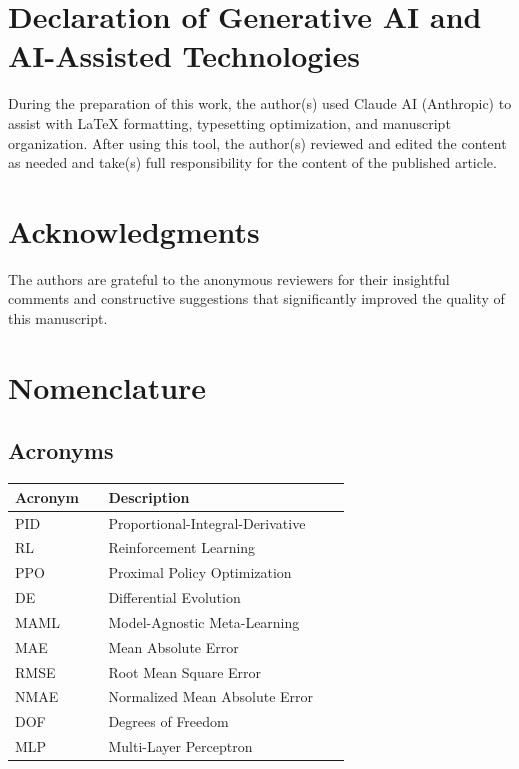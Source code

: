 \documentclass[a4paper]{cas-sc}
\begin{document}
\section*{Declaration of Generative AI and AI-Assisted Technologies}

During the preparation of this work, the author(s) used Claude AI (Anthropic) to assist with LaTeX formatting, typesetting optimization, and manuscript organization. After using this tool, the author(s) reviewed and edited the content as needed and take(s) full responsibility for the content of the published article.

\section*{Acknowledgments}

The authors are grateful to the anonymous reviewers for their insightful comments and constructive suggestions that significantly improved the quality of this manuscript.


\printcredits


\section*{Nomenclature}

\subsection*{Acronyms}
\begin{tabular}{@{}p{0.25\linewidth}p{0.65\linewidth}@{}}
\toprule
\textbf{Acronym} & \textbf{Description} \\
\midrule
PID & Proportional-Integral-Derivative \\
RL & Reinforcement Learning \\
PPO & Proximal Policy Optimization \\
DE & Differential Evolution \\
MAML & Model-Agnostic Meta-Learning \\
MAE & Mean Absolute Error \\
RMSE & Root Mean Square Error \\
NMAE & Normalized Mean Absolute Error \\
DOF & Degrees of Freedom \\
MLP & Multi-Layer Perceptron \\
\bottomrule
\end{tabular}
\end{document}

